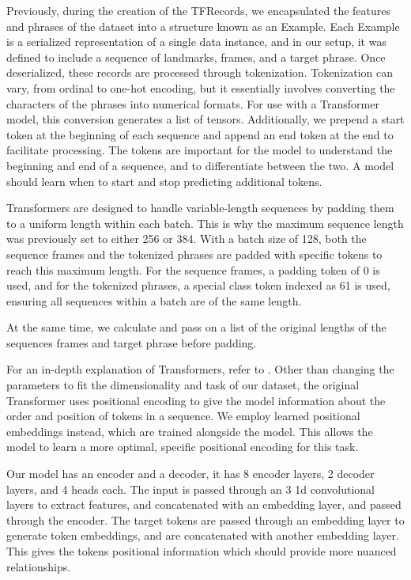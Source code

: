 \documentclass[preprint,11pt,review,authoryear]{elsarticle}
\begin{document}
Previously, during the creation of the TFRecords, we encapsulated the features and phrases of the dataset into a structure known as an Example. Each Example is a serialized representation of a single data instance, and in our setup, it was defined to include a sequence of landmarks, frames, and a target phrase. Once deserialized, these records are processed through tokenization. Tokenization can vary, from ordinal to one-hot encoding, but it essentially involves converting the characters of the phrases into numerical formats. For use with a Transformer model, this conversion generates a list of tensors. Additionally, we prepend a start token at the beginning of each sequence and append an end token at the end to facilitate processing. The tokens are important for the model to understand the beginning and end of a sequence, and to differentiate between the two. A model should learn when to start and stop predicting additional tokens.

Transformers are designed to handle variable-length sequences by padding them to a uniform length within each batch. This is why the maximum sequence length was previously set to either 256 or 384. With a batch size of 128, both the sequence frames and the tokenized phrases are padded with specific tokens to reach this maximum length. For the sequence frames, a padding token of 0 is used, and for the tokenized phrases, a special class token indexed as 61 is used, ensuring all sequences within a batch are of the same length.

At the same time, we calculate and pass on a list of the original lengths of the sequences frames  and target phrase before padding.

For an in-depth explanation of Transformers, refer to \cite{vaswaniAttentionAllYou2023}. Other than changing the parameters to fit the dimensionality and task of our dataset, the original Transformer uses positional encoding to give the model information about the order and position of tokens in a sequence. We employ learned positional embeddings instead, which are trained alongside the model. This allows the model to learn a more optimal, specific positional encoding for this task.

Our model has an encoder and a decoder, it has 8 encoder layers, 2 decoder layers, and 4 heads each. The input is passed through an 3 1d convolutional layers to extract features, and concatenated with an embedding layer, and passed through the encoder. The target tokens are passed through an embedding layer to generate token embeddings, and are concatenated with another embedding layer. This gives the tokens positional information which should provide more nuanced relationships.
\end{document}
